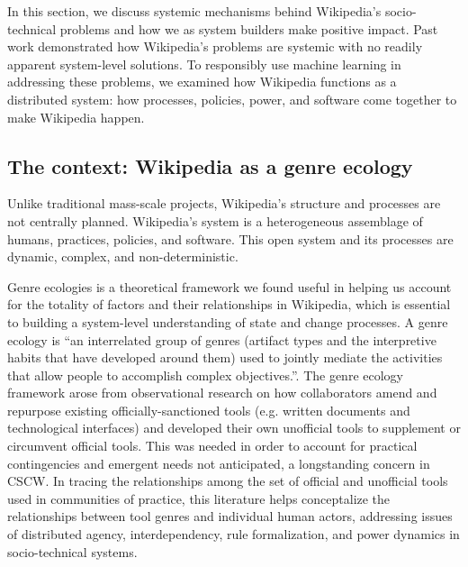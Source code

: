 In this section, we discuss systemic mechanisms behind Wikipedia's socio-technical problems and how we as system builders make positive impact.  Past work demonstrated how Wikipedia's problems are systemic with no readily apparent system-level solutions. To responsibly use machine learning in addressing these problems, we examined how Wikipedia functions as a distributed system: how processes, policies, power, and software come together to make Wikipedia happen.

\subsection{The context: Wikipedia as a genre ecology}
Unlike traditional mass-scale projects, Wikipedia's structure and processes are not centrally planned. Wikipedia's system is a heterogeneous assemblage of humans, practices, policies, and software.  This open system and its processes are dynamic, complex, and non-deterministic.

Genre ecologies is a theoretical framework we found useful in helping us account for the totality of factors and their relationships in Wikipedia, which is essential to building a system-level understanding of state and change processes.  A genre ecology is ``an interrelated group of genres (artifact types and the interpretive habits that have developed around them) used to jointly mediate the activities that allow people to accomplish complex objectives.''\cite{spinuzzi2000genre}. The genre ecology framework arose from observational research on how collaborators amend and repurpose existing officially-sanctioned tools (e.g. written documents and technological interfaces) and developed their own unofficial tools to supplement or circumvent official tools. This was needed in order to account for practical contingencies and emergent needs not anticipated, a longstanding concern in CSCW. In tracing the relationships among the set of official and unofficial tools used in communities of practice, this literature helps conceptalize the relationships between tool genres and individual human actors, addressing issues of distributed agency, interdependency, rule formalization, and power dynamics in socio-technical systems\cite{spinuzzi2003tracing}.

